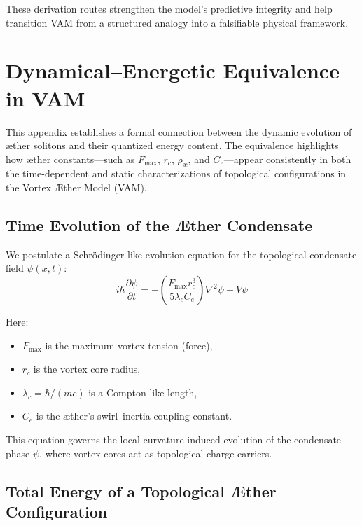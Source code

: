         \vspace{1em}

        These derivation routes strengthen the model’s predictive integrity and help transition VAM from a structured analogy into a falsifiable physical framework.


\section{Dynamical–Energetic Equivalence in VAM}

            This appendix establishes a formal connection between the dynamic evolution of æther solitons and their quantized energy content. The equivalence highlights how æther constants—such as $F_{\max}$, $r_c$, $\rho_{\text{æ}}$, and $C_e$—appear consistently in both the time-dependent and static characterizations of topological configurations in the Vortex Æther Model (VAM).

            \subsection{Time Evolution of the Æther Condensate}

            We postulate a Schrödinger-like evolution equation for the topological condensate field $\psi(x,t)$:
            \begin{equation}
            i\hbar \frac{\partial \psi}{\partial t} = - \left( \frac{F_{\max} r_c^3}{5 \lambda_c C_e} \right) \nabla^2 \psi + V \psi
            \end{equation}

            Here:
            \begin{itemize}
              \item $F_{\max}$ is the maximum vortex tension (force),
              \item $r_c$ is the vortex core radius,
              \item $\lambda_c = \hbar / (m c)$ is a Compton-like length,
              \item $C_e$ is the æther’s swirl–inertia coupling constant.
            \end{itemize}

            This equation governs the local curvature-induced evolution of the condensate phase $\psi$, where vortex cores act as topological charge carriers.

            \subsection{Total Energy of a Topological Æther Configuration}

